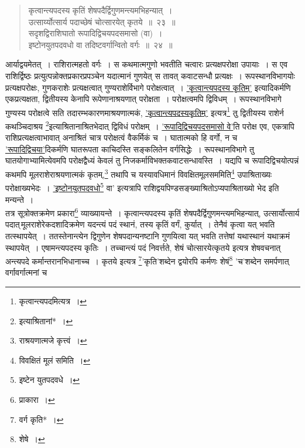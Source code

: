 \documentclass[10pt, openany]{book}
\begin{document}
{\begin{quote}
 \label{23}
{\bs कृत्वान्त्यपदस्य कृतिं शेषपदैर्द्विगुणमन्त्यमभिहन्यात्~। \\
 उत्सार्य्योत्सार्य पदाच्छेषं चोत्सारयेत् कृतये~॥~२३~॥ \\
 सदृशद्विराशिघातो रूपादिद्विचयपदसमासो (वा)~। \\
 इष्टोनयुतपदवधो वा तदिष्टवर्गान्वितो वर्गः~॥~२४~॥}\end{quote}

{आर्याद्वयमेतत्~। राशिरात्महतो वर्गः~। स कथमात्मगुणो भवतीति चत्वारः
प्रत्यक्षपरोक्षा उपायाः~। स एव राशिर्द्विष्ठः प्रत्युत्पन्नोक्तप्रकारप्रपञ्चेन
यदात्मानं गुणयेत् स}
{तावत् कवाटसन्धौ प्रत्यक्षः~। रूपस्थानविभागयोः प्रत्यक्षपरोक्षः,
गुणकराशेः प्रत्यक्षत्वात्}
{गुण्यराशेर्विभागे परोक्षत्वात्~। \hyperref[23]{'कृत्वान्त्यपदस्य कृतिम्'} इत्यादिकर्मणि
एकप्रत्यक्षता, द्वितीयस्य}
{केनापि रूपेणानाश्रयणात् परोक्षता~। परोक्षत्वमपि द्विविधम्~।
रूपस्थानविभागे गुण्यस्य}
{परोक्षत्वे सति तदारम्भकारणमाश्रयणात्मकं,
\hyperref[23]{'कृत्वान्त्यपदस्यकृतिम्'} इत्यत्र\renewcommand{\thefootnote}{\s १}\footnote{\s कृत्वान्त्यपदमित्यत्र~।} तु द्वितीयस्य राशेर्न}
{कथञ्चिदाश्रय \renewcommand{\thefootnote}{\s २}\footnote{\s इत्याश्रितानां*~।}इत्याश्रितानाश्रितभेदात् द्विविधं परोक्षम्~। \hyperref[23]{'रूपादिद्विचयपदसमासो वे'}ति}
{परोक्ष एव, एकत्रापि राशिप्रत्यक्षत्वाभावात्}
{अनाश्रितं चात्र परोक्षत्वं
वैकर्मिकं च~। घातात्मको}
{हि वर्गो, न च \hyperref[23]{'रूपादिद्विचया'}दिकर्मणि घातरूपता काचिदस्ति सङ्कलितेन
वर्गसिद्धेः~।}
{रूपस्थानविभागे तु घातयोगाभ्यामित्येवमपि 
परोक्षद्वैध्यं केवलं तु
निजकर्माविभक्तकवाटसन्धावस्ति~। यद्यपि च रूपादिद्विचयोत्पन्नं कथमपि
मूलराशेराश्रयणात्मकं कृतम्,\renewcommand{\thefootnote}{\s ३}\footnote{\s *राश्रयणात्मजे कृत्त्वं~।}}
{तथापि च यस्यावधिमानं विवक्षितमूलसममिति\renewcommand{\thefootnote}{\s ४}\footnote{\s विवक्षितं मूलं समिति~।}  उपाश्रिताख्यः
परोक्षाख्यभेदः~। \hyperref[23]{'इष्टोनयुतपदवधो\renewcommand{\thefootnote}{\s ५}\footnote{\s  इष्टेन युतपदवधे~।} वा'} इत्यत्रापि राशिद्वयपिण्डसङ्ख्याश्रितोऽप्यपाश्रिताख्यो
भेद इति मन्यन्ते~।}\\

{तत्र सूत्रोक्तक्रमेण प्रकारा\renewcommand{\thefootnote}{\s ६}\footnote{\s प्राकारा~।} व्याख्यायन्ते~। कृत्वान्त्यपदस्य
कृतिं शेषपदैर्द्विगुणमन्त्यमभिहन्यात्, 
उत्सार्योत्सार्य पदात्\textendash \,मूलराशेरेकदशादिक्रमेण यदन्त्यं
पदं स्थानं, तस्य कृतिं वर्गं, कुर्यात्~।}
{तेनैवं कृत्वा यत् भवति तत्स्थापयेत्~। ततस्तेनान्त्येन द्विगुणेन
शेषपदान्यनष्टानि गुणयित्वा}
{यत् भवति तत्तेषां यथास्थानं यथाक्रमं स्थापयेत्~। एषामन्त्यपदस्य कृतिः~।
तच्चान्त्यं पदं}
{निवर्त्तते, शेषं चोत्सारयेत्कृतये इत्यत्र शेषवचनात् अन्त्यपदे
कर्मान्तरानभिधानाच्च~।}
{कृतये इत्यत्र \renewcommand{\thefootnote}{\s ७}\footnote{\s वर्ग कृति*~।}'कृति'शब्देन द्वयोरपि कर्मणः शेषं\renewcommand{\thefootnote}{\s ८}\footnote{\s शेषे~।} 'च'शब्देन
समर्पणात् वर्गावर्गात्मनां च}


}
\end{document}
